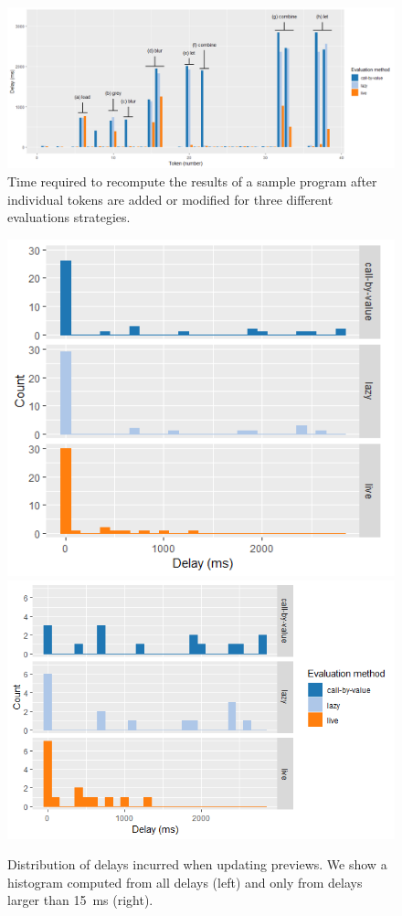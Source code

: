 \documentclass[english,crc,references=cleveref]{programming}
\theoremstyle{plain}
\theoremstyle{definition}
\begin{document}

\begin{figure}
%
\begin{wide}\includegraphics[width=\linewidth]{figures/drawing.png} \end{wide}
\caption{Time required to recompute the results of a sample program after individual tokens
  are added or modified for three different evaluations strategies.}
\label{fig:drawing}
%
\end{figure}


\begin{figure}
%
\begin{wide}
\includegraphics[width=.5\linewidth]{figures/hist-all.png}%
\includegraphics[width=.5\linewidth]{figures/hist-slow.png}
\end{wide}
\caption{Distribution of delays incurred when updating previews.
  We show a histogram computed from all delays (left) and only from delays larger
  than \SI{15}{\ms} (right).}
\label{fig:drawing-hist}
%
\end{figure}
\end{document}

